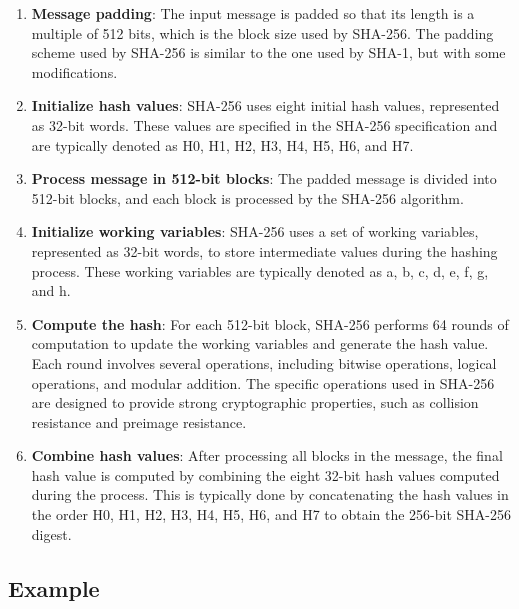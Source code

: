 \documentclass[11pt]{article}
\begin{document}
\begin{enumerate}
    \item \textbf{Message padding}: The input message is padded so that its length is a multiple of 512 bits, which is the block size used by SHA-256. The padding scheme used by SHA-256 is similar to the one used by SHA-1, but with some modifications.

    \item \textbf{Initialize hash values}: SHA-256 uses eight initial hash values, represented as 32-bit words. These values are specified in the SHA-256 specification and are typically denoted as H0, H1, H2, H3, H4, H5, H6, and H7.

    \item \textbf{Process message in 512-bit blocks}: The padded message is divided into 512-bit blocks, and each block is processed by the SHA-256 algorithm.

    \item \textbf{Initialize working variables}: SHA-256 uses a set of working variables, represented as 32-bit words, to store intermediate values during the hashing process. These working variables are typically denoted as a, b, c, d, e, f, g, and h.

    \item \textbf{Compute the hash}: For each 512-bit block, SHA-256 performs 64 rounds of computation to update the working variables and generate the hash value. Each round involves several operations, including bitwise operations, logical operations, and modular addition. The specific operations used in SHA-256 are designed to provide strong cryptographic properties, such as collision resistance and preimage resistance.

    \item \textbf{Combine hash values}: After processing all blocks in the message, the final hash value is computed by combining the eight 32-bit hash values computed during the process. This is typically done by concatenating the hash values in the order H0, H1, H2, H3, H4, H5, H6, and H7 to obtain the 256-bit SHA-256 digest.
\end{enumerate}

\subsection{Example}
\end{document}
